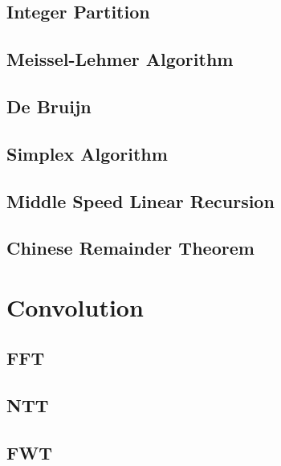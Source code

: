 \documentclass[a4paper,10pt,twocolumn,oneside]{article}
\begin{document}
\subsection{Integer Partition}


\subsection{Meissel-Lehmer Algorithm}


\subsection{De Bruijn}


\subsection{Simplex Algorithm}


\subsection{Middle Speed Linear Recursion}


\subsection{Chinese Remainder Theorem}


\section{Convolution}

\subsection{FFT}


\subsection{NTT}


\subsection{FWT}

\end{document}
